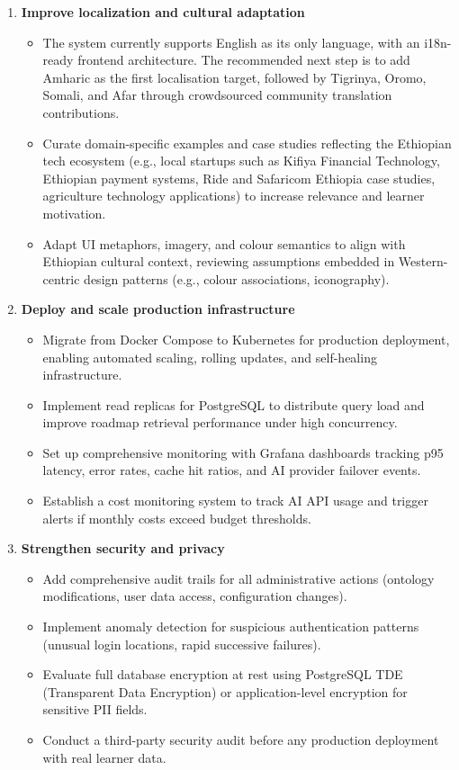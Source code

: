 \begin{enumerate}
    \item \textbf{Improve localization and cultural adaptation}
        \begin{itemize}
            \item The system currently supports English as its only language, with an i18n-ready frontend architecture. The recommended next step is to add Amharic as the first localisation target, followed by Tigrinya, Oromo, Somali, and Afar through crowdsourced community translation contributions.
            \item Curate domain-specific examples and case studies reflecting the Ethiopian tech ecosystem (e.g., local startups such as Kifiya Financial Technology, Ethiopian payment systems, Ride and Safaricom Ethiopia case studies, agriculture technology applications) to increase relevance and learner motivation.
            \item Adapt UI metaphors, imagery, and colour semantics to align with Ethiopian cultural context, reviewing assumptions embedded in Western-centric design patterns (e.g., colour associations, iconography).
        \end{itemize}

    \item \textbf{Deploy and scale production infrastructure}
        \begin{itemize}
            \item Migrate from Docker Compose to Kubernetes for production deployment, enabling automated scaling, rolling updates, and self-healing infrastructure.
            \item Implement read replicas for PostgreSQL to distribute query load and improve roadmap retrieval performance under high concurrency.
            \item Set up comprehensive monitoring with Grafana dashboards tracking p95 latency, error rates, cache hit ratios, and AI provider failover events.
            \item Establish a cost monitoring system to track AI API usage and trigger alerts if monthly costs exceed budget thresholds.
        \end{itemize}

    \item \textbf{Strengthen security and privacy}
        \begin{itemize}
            \item Add comprehensive audit trails for all administrative actions (ontology modifications, user data access, configuration changes).
            \item Implement anomaly detection for suspicious authentication patterns (unusual login locations, rapid successive failures).
            \item Evaluate full database encryption at rest using PostgreSQL TDE (Transparent Data Encryption) or application-level encryption for sensitive PII fields.
            \item Conduct a third-party security audit before any production deployment with real learner data.
        \end{itemize}


\end{enumerate}
